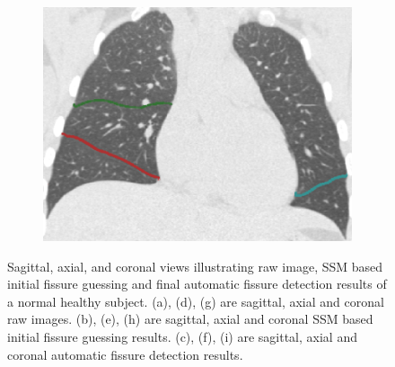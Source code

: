 {\begin{figure}[htbp]
\begin{subfigure}{.32\linewidth}
  \includegraphics[width=\linewidth,trim={{.0\wd0} {.0\wd0} {.0\wd0} {.0\wd0}},clip]{Segmentation/Image/H1335_FRC_PCAFissureDetection_Coronal.png}
  \caption{}
  \label{fig:HLASegmentationResults-i} 
\end{subfigure}
\caption{Sagittal, axial, and coronal views illustrating raw image, SSM based initial fissure guessing and final automatic fissure detection results of a normal healthy subject. (a), (d), (g) are sagittal, axial and coronal raw images. (b), (e), (h) are sagittal, axial and coronal SSM based initial fissure guessing results. (c), (f), (i) are sagittal, axial and coronal automatic fissure detection results.}
\label{fig:HLASegmentationResults}
\end{figure}

}
